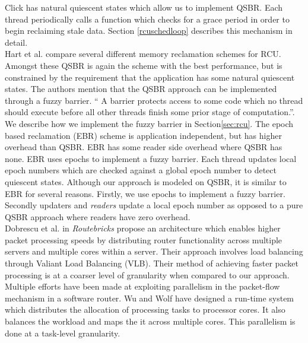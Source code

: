 \documentclass[a4paper,marginparwidth=50pt,marginparsep=10pt]{article}
\begin{document}
Click has natural quiescent states which allow us to implement QSBR. Each thread periodically calls a function which checks for a grace period in order to begin reclaiming stale data. Section \ref{rcuschedloop} describes this mechanism in detail.\\

Hart et al.\cite{hart} compare several different memory reclamation schemes for RCU. Amongst these QSBR is again the scheme with the best performance, but is constrained by the requirement that the application has some natural quiescent states. The authors mention that the QSBR approach can be implemented through a fuzzy barrier. `` A barrier protects access to some code which no thread should execute before all other threads finish some prior stage of computation.''. We describe how we implement the fuzzy barrier in Section\ref{sec:rcu}. The epoch based reclamation (EBR) scheme is application independent, but has higher overhead than QSBR. EBR has some reader side overhead where QSBR has none. EBR uses epochs to implement a fuzzy barrier. Each thread updates local epoch numbers which are checked against a global epoch number to detect quiescent states. Although our approach is modeled on QSBR, it is similar to EBR for several reasons. Firstly, we use epochs to implement a fuzzy barrier. Secondly updaters and \emph{readers} update a local epoch number as opposed to a pure QSBR approach where readers have zero overhead.\\

Dobrescu et al. \cite{routebricks} in \emph{Routebricks} propose an architecture which enables higher packet processing speeds by distributing router functionality across multiple servers and multiple cores within a server. Their approach involves load balancing through Valiant Load Balancing (VLB). Their method of achieving faster packet processing is at a coarser level of granularity when compared to our approach.\\

Multiple efforts have been made at exploiting parallelism in the packet-flow mechanism in a software router. Wu and Wolf \cite{runtimepacketprocessing} have designed a run-time system which distributes the allocation of processing tasks to processor cores. It also balances the workload and maps the it across multiple cores. This parallelism is done at a task-level granularity.\\ 
\end{document}
